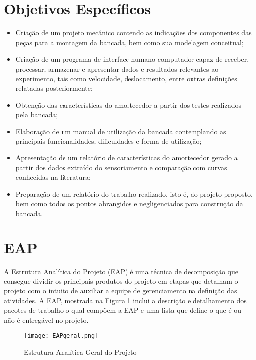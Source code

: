 			

	\section{Objetivos Específicos}
	\label{sec:tap_objetivos_especificos}

		\begin{itemize}
			\item Criação de um projeto mecânico contendo as indicações dos componentes das peças para a montagem da bancada, bem como sua modelagem conceitual;
			\item Criação de um programa de interface humano-computador capaz de receber, processar, armazenar e apresentar dados e resultados relevantes ao experimento, tais como velocidade, deslocamento, entre outras definições relatadas posteriormente;
			\item Obtenção das características do amortecedor a partir dos testes realizados pela bancada;
			\item Elaboração de um manual de utilização da bancada contemplando as principais funcionalidades, dificuldades e forma de utilização;
			\item Apresentação de um relatório de características do amortecedor gerado a partir dos dados extraído do sensoriamento e comparação com curvas conhecidas na literatura;
			\item Preparação de um relatório do trabalho realizado, isto é, do projeto proposto, bem como todos os pontos abrangidos e negligenciados para construção da bancada.
		\end{itemize}
		

	\section{EAP}
	\label{sec:tap_EAP}

		A Estrutura Analítica do Projeto (EAP) é uma técnica de decomposição que consegue dividir os principais produtos do projeto em etapas que detalham o projeto com o intuito de auxiliar a equipe de gerenciamento na definição das atividades. A EAP, mostrada na Figura \ref{EAP} inclui a descrição e detalhamento dos pacotes de trabalho o qual compõem a EAP e uma lista que define o que é ou não é entregável no projeto.

		\begin{figure}[!h]
			\centering
			\texttt{[image: EAPgeral.png]}
			\caption{Estrutura Analítica Geral do Projeto}
			\label{EAP}
		\end{figure}


